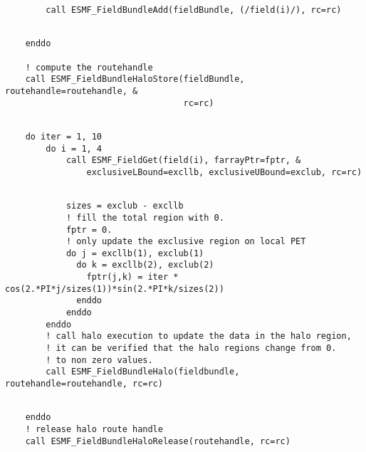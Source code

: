 
 \begin{verbatim}
        call ESMF_FieldBundleAdd(fieldBundle, (/field(i)/), rc=rc)
 
\end{verbatim}
 

 \begin{verbatim}
    enddo

    ! compute the routehandle
    call ESMF_FieldBundleHaloStore(fieldBundle, routehandle=routehandle, &
                                   rc=rc)
 
\end{verbatim}
 

 \begin{verbatim}
    do iter = 1, 10
        do i = 1, 4
            call ESMF_FieldGet(field(i), farrayPtr=fptr, &
                exclusiveLBound=excllb, exclusiveUBound=exclub, rc=rc)
 
\end{verbatim}
 

 \begin{verbatim}
            sizes = exclub - excllb
            ! fill the total region with 0.
            fptr = 0.
            ! only update the exclusive region on local PET
            do j = excllb(1), exclub(1)
              do k = excllb(2), exclub(2)
                fptr(j,k) = iter * cos(2.*PI*j/sizes(1))*sin(2.*PI*k/sizes(2))
              enddo 
            enddo 
        enddo
        ! call halo execution to update the data in the halo region,
        ! it can be verified that the halo regions change from 0. 
        ! to non zero values.
        call ESMF_FieldBundleHalo(fieldbundle, routehandle=routehandle, rc=rc)
 
\end{verbatim}
 

 \begin{verbatim}
    enddo
    ! release halo route handle
    call ESMF_FieldBundleHaloRelease(routehandle, rc=rc)
 
\end{verbatim}

\setlength{\parskip}{\oldparskip}
\setlength{\parindent}{\oldparindent}
\setlength{\baselineskip}{\oldbaselineskip}
